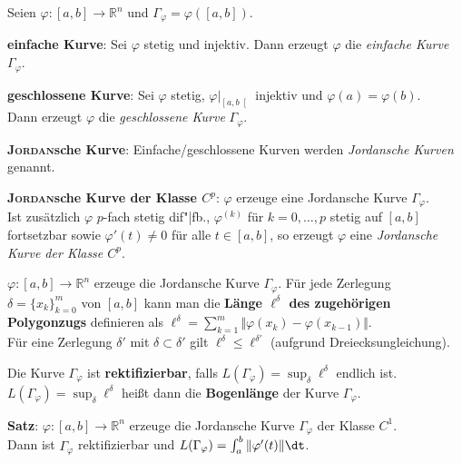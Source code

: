 Seien $\varphi: [a,b] \rightarrow \mathbb{R}^n$ und
$\Gamma_\varphi = \varphi([a,b])$.

\textbf{einfache Kurve}: Sei $\varphi$ stetig und injektiv.
Dann erzeugt $\varphi$ die \emph{einfache Kurve} $\Gamma_\varphi$.

\textbf{geschlossene Kurve}: Sei $\varphi$ stetig,
$\varphi|_{\left[a,b\right[}$ injektiv und $\varphi(a) = \varphi(b)$. \\
Dann erzeugt $\varphi$ die \emph{geschlossene Kurve} $\Gamma_\varphi$.

\textbf{\textsc{Jordan}sche Kurve}: Einfache/geschlossene Kurven
werden \emph{Jordansche Kurven} genannt.

\textbf{\textsc{Jordan}sche Kurve der Klasse $C^p$}: $\varphi$ erzeuge eine
Jordansche Kurve $\Gamma_\varphi$. \\
Ist zusätzlich $\varphi$ $p$-fach stetig dif"|fb., $\varphi^{(k)}$ für
$k = 0, \ldots, p$ stetig auf $[a,b]$ fortsetzbar sowie $\varphi'(t) \not= 0$
für alle $t \in [a,b]$, so erzeugt $\varphi$ eine
\emph{Jordansche Kurve der Klasse $C^p$}.

\linie

$\varphi: [a,b] \rightarrow \mathbb{R}^n$ erzeuge die Jordansche Kurve
$\Gamma_\varphi$.
Für jede Zerlegung $\delta = \{x_k\}_{k=0}^m$ von $[a,b]$ kann man die
\textbf{Länge $\ell^\delta$ des zugehörigen Polygonzugs} definieren als
$\ell^\delta = \sum_{k=1}^m \Vert \varphi(x_k) - \varphi(x_{k-1}) \Vert$. \\
Für eine Zerlegung $\delta'$ mit $\delta \subset \delta'$ gilt
$\ell^\delta \le \ell^{\delta'}$ (aufgrund Dreiecksungleichung).

Die Kurve $\Gamma_\varphi$ ist \textbf{rektifizierbar}, falls
$L(\Gamma_\varphi) = \sup_\delta \ell^\delta$ endlich ist. \\
$L(\Gamma_\varphi) = \sup_\delta \ell^\delta$ heißt dann die
\textbf{Bogenlänge} der Kurve $\Gamma_\varphi$.

\textbf{Satz}: $\varphi: [a,b] \rightarrow \mathbb{R}^n$ erzeuge die
Jordansche Kurve $\Gamma_\varphi$ der Klasse $C^1$. \\
Dann ist $\Gamma_\varphi$ rektifizierbar und
$L(\Gamma_\varphi) = \int_a^b \Vert \varphi'(t) \Vert \dt$.

\linie

